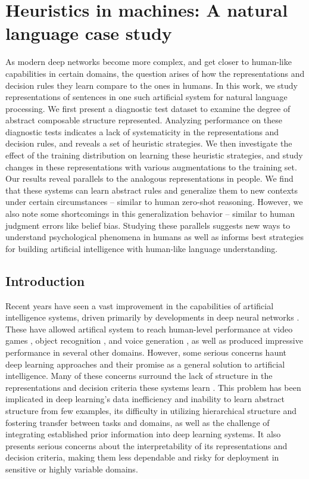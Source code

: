 \chapter{Heuristics in machines: A natural language case study}
\label{introduction}



As modern deep networks become more complex, and get closer to human-like capabilities in certain domains, the question arises of how the representations and decision rules they learn compare to the ones in humans. In this work, we study representations of sentences in one such artificial system for natural language processing. We first present a diagnostic test dataset to examine the degree of abstract composable structure represented. Analyzing performance on these diagnostic tests indicates a lack of systematicity in the representations and decision rules, and reveals a set of heuristic strategies. We then investigate the effect of the training distribution on learning these heuristic strategies, and study changes in these representations with various augmentations to the training set. Our results reveal parallels to the analogous representations in people. We find that these systems can learn abstract rules and generalize them to new contexts under certain circumstances -- similar to human zero-shot reasoning. However, we also note some shortcomings in this generalization behavior -- similar to human judgment errors like belief bias. Studying these parallels suggests new ways to understand psychological phenomena in humans as well as informs best strategies for building artificial intelligence with human-like language understanding.

\section{Introduction}

Recent years have seen a vast improvement in the capabilities of artificial intelligence systems, driven primarily by developments in deep neural networks \citep[see][for a review]{lecun2015deep}. These have allowed artifical system to reach human-level performance at video games \citep{mnih2015human}, object recognition \citep{russakovsky2015imagenet}, and voice generation \citep{oord2016wavenet}, as well as produced impressive performance in several other domains. However, some serious concerns haunt deep learning approaches and their promise as a general solution to artificial intelligence. Many of these concerns surround the lack of structure in the representations and decision criteria these systems learn \citep{marcus2018deep,lake18}. This problem has been implicated in deep learning's data inefficiency and inability to learn abstract structure from few examples, its difficulty in utilizing hierarchical structure and fostering transfer between tasks and domains, as well as the challenge of integrating established prior information into deep learning systems. It also presents serious concerns about the interpretability of its representations and decision criteria, making them less dependable and risky for deployment in sensitive or highly variable domains. 


